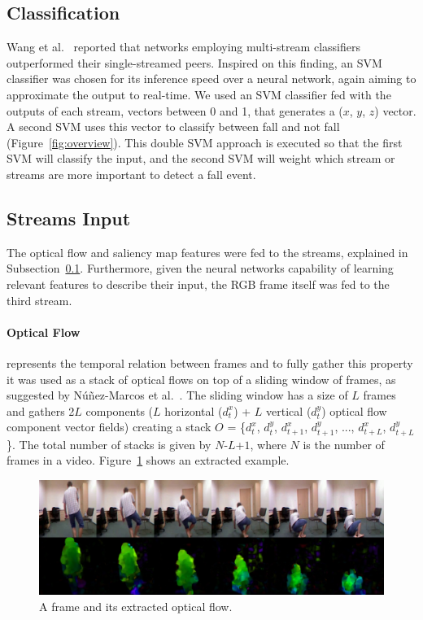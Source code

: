 \documentclass[conference]{IEEEtran}
\begin{document}
\subsection{Classification}
\label{sec:classification}

Wang et al.~\cite{wang2015towards} reported that networks employing multi-stream classifiers outperformed their single-streamed peers. Inspired on this finding, an SVM classifier was chosen for its inference speed over a neural network, again aiming to approximate the output to real-time. We used an SVM classifier fed with the outputs of each stream, vectors between 0 and 1, that generates a ($x$, $y$, $z$) vector. A second SVM uses this vector to classify between fall and not fall (Figure~\ref{fig:overview}). This double SVM approach is executed so that the first SVM will classify the input, and the second SVM will weight which stream or streams are more important to detect a fall event.

\subsection{Streams Input}

The optical flow and saliency map features were fed to the streams, explained in Subsection~\ref{sec:classification}. Furthermore, given the neural networks capability of learning relevant features to describe their input, the RGB frame itself was fed to the third stream.
\paragraph{Optical Flow} represents the temporal relation between frames and to fully gather this property it was used as a stack of optical flows on top of a sliding window of frames, as suggested by N\'u\~nez-Marcos et al.~\cite{nunez2017vision}. The sliding window has a size of $L$ frames and gathers 2$L$ components ($L$ horizontal ($d_t^x$) + $L$ vertical ($d_t^y$) optical flow component vector fields) creating a stack $O$ = \{$d_t^x$, $d_t^y$, $d_{t+1}^x$, $d_{t+1}^y$, ..., $d_{t+L}^x$, $d_{t+L}^y$\}. The total number of stacks is given by $N$-$L$+$1$, where $N$ is the number of frames in a video. Figure~\ref{fig:of} shows an extracted example.
\begin{figure}[htbp]
\centerline{\includegraphics[width=\linewidth]{figures/of.png}}
\caption{A frame and its extracted optical flow.}
\label{fig:of}
\end{figure}
\end{document}
